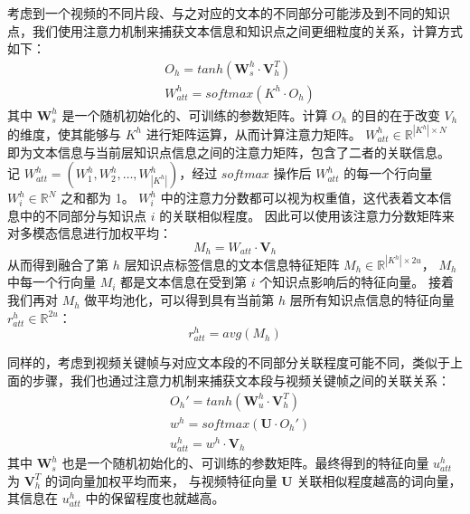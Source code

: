     考虑到一个视频的不同片段、与之对应的文本的不同部分可能涉及到不同的知识点，我们使用注意力机制来捕获文本信息和知识点之间更细粒度的关系，计算方式如下：
    \begin{equation}
        \begin{aligned}
            &O_h = tanh(\boldsymbol{W}_s^h \cdot \boldsymbol{V}_h^T) \\
            &W_{att}^h = softmax(K^h \cdot O_h)
        \end{aligned}
    \end{equation}
    其中 $\boldsymbol{W}_s^h$ 是一个随机初始化的、可训练的参数矩阵。计算 $O_h$ 的目的在于改变 $V_h$ 的维度，使其能够与 $K^h$ 进行矩阵运算，从而计算注意力矩阵。
    $W_{att}^h \in \mathbb{R}^{\left|K^h\right| \times N}$ 即为文本信息与当前层知识点信息之间的注意力矩阵，包含了二者的关联信息。
    记 $W_{att}^h = (W_1^h, W_2^h, \dots, W_{\left|K^h\right|}^h)$，经过 $softmax$ 操作后 $W_{att}^h$ 的每一个行向量 $W_i^h \in \mathbb{R}^N$ 之和都为 1。
    $W_i^h$ 中的注意力分数都可以视为权重值，这代表着文本信息中的不同部分与知识点 $i$ 的关联相似程度。
    因此可以使用该注意力分数矩阵来对多模态信息进行加权平均：
    \begin{equation}
        M_h = W_{att} \cdot \boldsymbol{V}_h
    \end{equation}
    从而得到融合了第 $h$ 层知识点标签信息的文本信息特征矩阵 $M_h \in \mathbb{R}^{{\left|K^h\right|} \times 2u}$，
    $M_h$ 中每一个行向量 $M_i$ 都是文本信息在受到第 $i$ 个知识点影响后的特征向量。
    接着我们再对 $M_h$ 做平均池化，可以得到具有当前第 $h$ 层所有知识点信息的特征向量 $r_{att}^h \in \mathbb{R}^{2u}$：
    \begin{equation}
        r_{att}^h = avg(M_h)
    \end{equation}

    同样的，考虑到视频关键帧与对应文本段的不同部分关联程度可能不同，类似于上面的步骤，我们也通过注意力机制来捕获文本段与视频关键帧之间的关联关系：
    \begin{equation}
        \begin{aligned}
            &O_h' = tanh(\boldsymbol{W}_u^h \cdot \boldsymbol{V}_h^T) \\
            &w^h = softmax(\boldsymbol{U} \cdot O_h') \\
            &u_{att}^h = w^h \cdot \boldsymbol{V}_h
        \end{aligned}
    \end{equation}
    其中 $\boldsymbol{W}_s^h$ 也是一个随机初始化的、可训练的参数矩阵。最终得到的特征向量 $u_{att}^h$ 为 $\boldsymbol{V}_h^T$ 的词向量加权平均而来，
    与视频特征向量 $\boldsymbol{U}$ 关联相似程度越高的词向量，其信息在 $u_{att}^h$ 中的保留程度也就越高。

